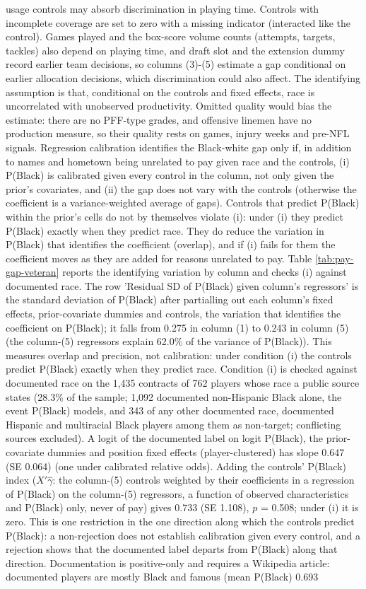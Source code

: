 {usage controls may absorb discrimination in playing time. Controls with incomplete coverage are set to zero with a missing indicator (interacted like the control). Games played and the box-score volume counts (attempts, targets, tackles) also depend on playing time, and draft slot and the extension dummy record earlier team decisions, so columns (3)-(5) estimate a gap conditional on earlier allocation decisions, which discrimination could also affect. The identifying assumption is that, conditional on the controls and fixed effects, race is uncorrelated with unobserved productivity. Omitted quality would bias the estimate: there are no PFF-type grades, and offensive linemen have no production measure, so their quality rests on games, injury weeks and pre-NFL signals. Regression calibration identifies the Black-white gap only if, in addition to names and hometown being unrelated to pay given race and the controls, (i) P(Black) is calibrated given every control in the column, not only given the prior's covariates, and (ii) the gap does not vary with the controls (otherwise the coefficient is a variance-weighted average of gaps). Controls that predict P(Black) within the prior's cells do not by themselves violate (i): under (i) they predict P(Black) exactly when they predict race. They do reduce the variation in P(Black) that identifies the coefficient (overlap), and if (i) fails for them the coefficient moves as they are added for reasons unrelated to pay. Table \ref{tab:pay-gap-veteran} reports the identifying variation by column and checks (i) against documented race. The row 'Residual SD of P(Black) given column's regressors' is the standard deviation of P(Black) after partialling out each column's fixed effects, prior-covariate dummies and controls, the variation that identifies the coefficient on P(Black); it falls from 0.275 in column (1) to 0.243 in column (5) (the column-(5) regressors explain 62.0\% of the variance of P(Black)). This measures overlap and precision, not calibration: under condition (i) the controls predict P(Black) exactly when they predict race. Condition (i) is checked against documented race on the 1,435 contracts of 762 players whose race a public source states (28.3\% of the sample; 1,092 documented non-Hispanic Black alone, the event P(Black) models, and 343 of any other documented race, documented Hispanic and multiracial Black players among them as non-target; conflicting sources excluded). A logit of the documented label on logit P(Black), the prior-covariate dummies and position fixed effects (player-clustered) has slope 0.647 (SE 0.064) (one under calibrated relative odds). Adding the controls' P(Black) index ($X'\hat\gamma$: the column-(5) controls weighted by their coefficients in a regression of P(Black) on the column-(5) regressors, a function of observed characteristics and P(Black) only, never of pay) gives 0.733 (SE 1.108), $p$ = 0.508; under (i) it is zero. This is one restriction in the one direction along which the controls predict P(Black): a non-rejection does not establish calibration given every control, and a rejection shows that the documented label departs from P(Black) along that direction. Documentation is positive-only and requires a Wikipedia article: documented players are mostly Black and famous (mean P(Black) 0.693 }
